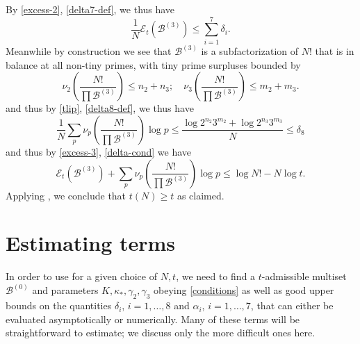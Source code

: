 \documentclass[12pt,a4paper,reqno]{amsart}
\numberwithin{equation}{section}
\theoremstyle{plain}
\theoremstyle{definition}
\newcommand\tuple{{\mathcal B}}
\newcommand\excess{{\mathcal{E}}}
\begin{document}
By \eqref{excess-2}, \eqref{delta7-def}, we thus have
\begin{equation}\label{excess-3}
 \frac{1}{N} \excess_t(\tuple^{(3)}) \leq \sum_{i=1}^7 \delta_i.
\end{equation}
Meanwhile by construction we see that $\tuple^{(3)}$ is a subfactorization of $N!$ that is in balance at all non-tiny primes, with tiny prime surpluses bounded by
$$ \nu_2\left( \frac{N!}{\prod \tuple^{(3)}}\right) \leq n_2+n_3; \quad \nu_3\left( \frac{N!}{\prod \tuple^{(3)}}\right) \leq m_2+m_3.$$
and thus by \eqref{tlip}, \eqref{delta8-def}, we thus have
$$ \frac{1}{N} \sum_p \nu_p\left( \frac{N!}{\prod \tuple^{(3)}}\right) \log p \leq \frac{\log 2^{n_2} 3^{m_2} + \log 2^{n_3} 3^{m_3}}{N} \leq \delta_8$$
and thus by \eqref{excess-3}, \eqref{delta-cond} we have
$$ \excess_t(\tuple^{(3)}) + \sum_p \nu_p\left( \frac{N!}{\prod \tuple^{(3)}}\right) \log p \leq \log N! - N \log t.$$
Applying , we conclude that $t(N) \geq t$ as claimed.

\section{Estimating terms}\label{construction-sec}

In order to use  for a given choice of $N,t$, we need to find a $t$-admissible multiset $\tuple^{(0)}$ and parameters $K, \kappa_*, \gamma_2, \gamma_3$ obeying \eqref{conditions} as well as good upper bounds on the quantities $\delta_i$, $i=1,\dots,8$ and $\alpha_i$, $i=1,\dots,7$, that can either be evaluated asymptotically or numerically.  Many of these terms will be straightforward to estimate; we discuss only the more difficult ones here.
\end{document}
